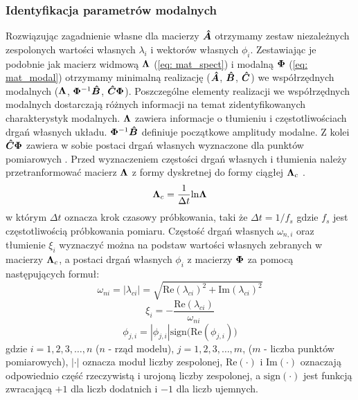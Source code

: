 \subsubsection{Identyfikacja parametrów modalnych}
Rozwiązując zagadnienie własne dla macierzy $\bm{\hat{A}}$ otrzymamy zestaw niezależnych zespolonych wartości własnych $\lambda_i$ i wektorów własnych $\phi_i$. Zestawiając je podobnie jak macierz widmową $\bm{\Lambda}$ (\ref{eq: mat_spect}) i modalną $\bm{\Phi}$ (\ref{eq: mat_modal}) otrzymamy minimalną realizację ($\bm{\hat{A}}$, $\bm{\hat{B}}$, $\bm{\hat{C}}$) we współrzędnych modalnych ($\bm{\Lambda}$, $\bm{\Phi}^{-1}\bm{\hat{B}}$, $\bm{\hat{C}}\bm{\Phi}$). Poszczególne elementy realizacji we współrzędnych modalnych dostarczają różnych informacji na temat zidentyfikowanych charakterystyk modalnych. $\bm{\Lambda}$ zawiera informacje o tłumieniu i częstotliwościach drgań własnych układu. $\bm{\Phi}^{-1}\bm{\hat{B}}$ definiuje początkowe amplitudy modalne. Z kolei $\bm{\hat{C}}\bm{\Phi}$ zawiera w sobie postaci drgań własnych wyznaczone dla punktów pomiarowych \parencite{Li2011}.
Przed wyznaczeniem częstości drgań własnych i tłumienia należy przetranformować macierz $\bm{\Lambda}$ z formy dyskretnej do formy ciągłej $\bm{\Lambda}_c$ \parencite{Szafranski2013}.
\begin{equation}
	\bm{\Lambda}_c = \frac{1}{\Delta t} \text{ln}\bm{\Lambda}
\end{equation} 
w którym $\Delta t$ oznacza krok czasowy próbkowania, taki że $\Delta t = 1/f_s$ gdzie $f_s$ jest częstotliwością próbkowania pomiaru. Częstość drgań własnych $\omega_{n,i}$ oraz tłumienie $\xi_i$ wyznaczyć można na podstaw wartości własnych zebranych w macierzy $\bm{\Lambda}_c$, a postaci drgań własnych $\phi_i$ z macierzy $\bm{\Phi}$ za pomocą następujących formuł:
\begin{equation}
	\omega_{ni} = |\lambda_{ci}|= \sqrt{\text{Re}(\lambda_{ci})^2+\text{Im}(\lambda_{ci})^2}
\end{equation}
\begin{equation}
	\xi_{i} = -\frac{\text{Re}(\lambda_{ci})}{\omega_{ni}} 
\end{equation}
\begin{equation}
	\phi_{j,i} = |\phi_{j,i}|\text{sign}\Big(\text{Re}(\phi_{j,i})\Big)
\end{equation}
gdzie $i=1,2,3,\dots,n$ ($n$ - rząd modelu), $j=1,2,3,\dots,m$, ($m$ - liczba punktów pomiarowych), $|\cdot|$ oznacza moduł liczby zespolonej, $\text{Re}(\cdot)$ i $\text{Im}(\cdot)$ oznaczają odpowiednio część rzeczywistą i urojoną liczby zespolonej, a $\text{sign}(\cdot)$ jest funkcją zwracającą $+1$ dla liczb dodatnich i $-1$ dla liczb ujemnych.

